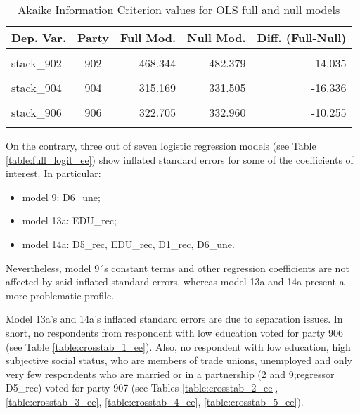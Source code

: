 \documentclass[
]{article}
\providecommand{\tightlist}{%
  \setlength{\itemsep}{0pt}\setlength{\parskip}{0pt}}
\begin{document}
\begin{table}[!h]

\caption{\label{tab:unnamed-chunk-52}Akaike Information Criterion values for OLS full and null models 
        \label{table:ols_aic_ee}}
\centering
\begin{tabular}[t]{lcrrr}
\toprule
Dep. Var. & Party & Full Mod. & Null Mod. & Diff. (Full-Null)\\
\midrule
\cellcolor{gray!6}{stack\_901} & \cellcolor{gray!6}{901} & \cellcolor{gray!6}{648.376} & \cellcolor{gray!6}{681.225} & \cellcolor{gray!6}{-32.850}\\
stack\_902 & 902 & 468.344 & 482.379 & -14.035\\
\cellcolor{gray!6}{stack\_903} & \cellcolor{gray!6}{903} & \cellcolor{gray!6}{523.076} & \cellcolor{gray!6}{555.418} & \cellcolor{gray!6}{-32.342}\\
stack\_904 & 904 & 315.169 & 331.505 & -16.336\\
\cellcolor{gray!6}{stack\_905} & \cellcolor{gray!6}{905} & \cellcolor{gray!6}{366.351} & \cellcolor{gray!6}{406.867} & \cellcolor{gray!6}{-40.517}\\
\addlinespace
stack\_906 & 906 & 322.705 & 332.960 & -10.255\\
\cellcolor{gray!6}{stack\_907} & \cellcolor{gray!6}{907} & \cellcolor{gray!6}{171.172} & \cellcolor{gray!6}{186.800} & \cellcolor{gray!6}{-15.628}\\
\bottomrule
\end{tabular}
\end{table}

On the contrary, three out of seven logistic regression models (see Table \ref{table:full_logit_ee}) show
inflated standard errors for some of the coefficients of interest. In particular:

\begin{itemize}
\tightlist
\item
  model 9: D6\_une;
\item
  model 13a: EDU\_rec;
\item
  model 14a: D5\_rec, EDU\_rec, D1\_rec, D6\_une.
\end{itemize}

Nevertheless, model 9´s constant terms and other regression coefficients are not affected by said inflated standard errors, whereas model 13a and 14a present a more problematic profile.

Model 13a's and 14a's inflated standard errors are due to separation issues. In short, no respondents from respondent with low education voted for party 906 (see Table \ref{table:crosstab_1_ee}). Also, no respondent with low education, high subjective social status, who are members of trade unions, unemployed and only very few respondents who are married or in a partnership (2 and 9;regressor D5\_rec) voted for party 907
(see Tables \ref{table:crosstab_2_ee}, \ref{table:crosstab_3_ee}, \ref{table:crosstab_4_ee},
\ref{table:crosstab_5_ee}).
\end{document}
